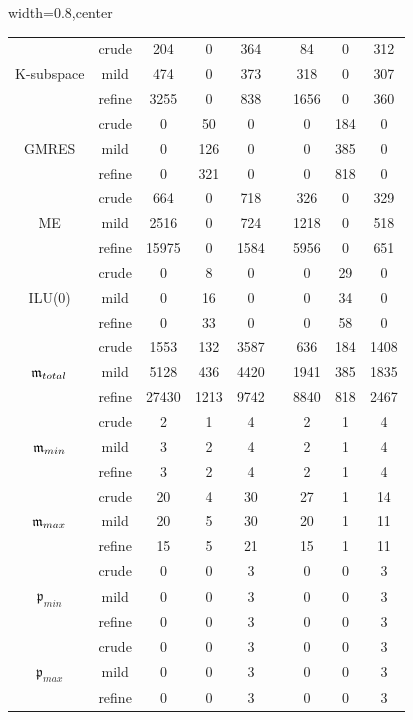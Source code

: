 \begin{table}[htb]
\begin{adjustbox}{width=0.8\columnwidth,center}
\begin{tabular}{  ccccccccc }
    \hline
    & crude & 204 & 0 & 364 &  & 84 & 0 & 312 \\
    K-subspace & mild & 474 & 0 & 373 &  & 318 & 0 & 307 \\
    & refine & 3255 & 0 & 838 &  & 1656 & 0 & 360 \\
    \hline
    & crude & 0 & 50 & 0 &  & 0 & 184 & 0 \\
    GMRES & mild & 0 & 126 & 0 &  & 0 & 385 & 0 \\
    & refine & 0 & 321 & 0 &  & 0 & 818 & 0 \\
    \hline
    & crude & 664 & 0 & 718 &  & 326 & 0 & 329 \\
    ME & mild & 2516 & 0 & 724 &  & 1218 & 0 & 518 \\
    & refine & 15975 & 0 & 1584 &  & 5956 & 0 & 651 \\
    \hline
    & crude & 0 & 8 & 0 &  & 0 & 29 & 0 \\
    ILU(0) & mild & 0 & 16 & 0 &  & 0 & 34 & 0 \\
    & refine & 0 & 33 & 0 &  & 0 & 58 & 0 \\
    \hline
    & crude & 1553 & 132 & 3587 &  & 636 & 184 & 1408 \\
    $\mathfrak{m}_{total}$ & mild & 5128 & 436 & 4420 &  & 1941 & 385 & 1835 \\
    & refine & 27430 & 1213 & 9742 &  & 8840 & 818 & 2467 \\
    \hline
    & crude & 2 & 1 & 4 &  & 2 & 1 & 4 \\
    $\mathfrak{m}_{min}$ & mild & 3 & 2 & 4 &  & 2 & 1 & 4 \\
    & refine & 3 & 2 & 4 &  & 2 & 1 & 4 \\
    \hline
    & crude & 20 & 4 & 30 &  & 27 & 1 & 14 \\
    $\mathfrak{m}_{max}$ & mild & 20 & 5 & 30 &  & 20 & 1 & 11 \\
    & refine & 15 & 5 & 21 &  & 15 & 1 & 11 \\
    \hline
    & crude & 0 & 0 & 3 &  & 0 & 0 & 3 \\
    $\mathfrak{p}_{min}$ & mild & 0 & 0 & 3 &  & 0 & 0 & 3 \\
    & refine & 0 & 0 & 3 &  & 0 & 0 & 3 \\
    \hline
    & crude & 0 & 0 & 3 &  & 0 & 0 & 3 \\
    $\mathfrak{p}_{max}$ & mild & 0 & 0 & 3 &  & 0 & 0 & 3 \\
    & refine & 0 & 0 & 3 &  & 0 & 0 & 3 \\
    \hline
\end{tabular}
\end{adjustbox}
	\label{tab:num-exp-lldp-var-step:brussdnd}
\end{table}

